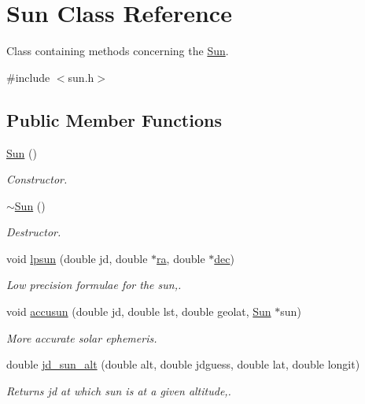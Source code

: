 \hypertarget{class_sun}{\section{Sun Class Reference}
\label{class_sun}
}


Class containing methods concerning the \hyperlink{class_sun}{Sun}.  




{\ttfamily \#include $<$sun.\-h$>$}

\subsection*{Public Member Functions}
\begin{DoxyCompactItemize}
\item 
\hypertarget{class_sun_aa3e508ffefb0cb76e55c2bdefdc907d1}{\hyperlink{class_sun_aa3e508ffefb0cb76e55c2bdefdc907d1}{Sun} ()}\label{class_sun_aa3e508ffefb0cb76e55c2bdefdc907d1}

\begin{DoxyCompactList}\small\item\em Constructor. \end{DoxyCompactList}\item 
\hypertarget{class_sun_a4e43fa67eca98adfb1fa900207af6120}{\hyperlink{class_sun_a4e43fa67eca98adfb1fa900207af6120}{$\sim$\-Sun} ()}\label{class_sun_a4e43fa67eca98adfb1fa900207af6120}

\begin{DoxyCompactList}\small\item\em Destructor. \end{DoxyCompactList}\item 
void \hyperlink{class_sun_aa4c863a1a8b7bcacf9c22b452c5ddae1}{lpsun} (double jd, double $\ast$\hyperlink{class_sun_a0edd085c46f080d5ee0d74b6d02c6882}{ra}, double $\ast$\hyperlink{class_sun_a0b28686e74b71ce04babcca5c366b2f8}{dec})
\begin{DoxyCompactList}\small\item\em Low precision formulae for the sun,. \end{DoxyCompactList}\item 
void \hyperlink{class_sun_af16ee9f8ae55645a636b3dafdea4821b}{accusun} (double jd, double lst, double geolat, \hyperlink{class_sun}{Sun} $\ast$sun)
\begin{DoxyCompactList}\small\item\em More accurate solar ephemeris. \end{DoxyCompactList}\item 
double \hyperlink{class_sun_a07495ac3dcccae90321aa41758e2de87}{jd\-\_\-sun\-\_\-alt} (double alt, double jdguess, double lat, double longit)
\begin{DoxyCompactList}\small\item\em Returns jd at which sun is at a given altitude,. \end{DoxyCompactList}\end{DoxyCompactItemize}
